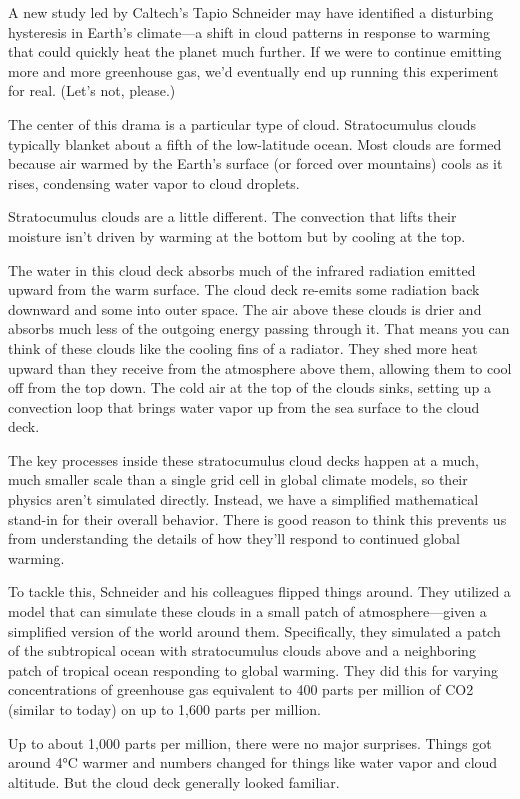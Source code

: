 \documentclass[
]{book}
\begin{document}
A new study led by Caltech's Tapio Schneider may have identified a disturbing hysteresis in Earth's climate---a shift in cloud patterns in response to warming that could quickly heat the planet much further. If we were to continue emitting more and more greenhouse gas, we'd eventually end up running this experiment for real. (Let's not, please.)

The center of this drama is a particular type of cloud. Stratocumulus clouds typically blanket about a fifth of the low-latitude ocean. Most clouds are formed because air warmed by the Earth's surface (or forced over mountains) cools as it rises, condensing water vapor to cloud droplets.

Stratocumulus clouds are a little different. The convection that lifts their moisture isn't driven by warming at the bottom but by cooling at the top.

The water in this cloud deck absorbs much of the infrared radiation emitted upward from the warm surface. The cloud deck re-emits some radiation back downward and some into outer space. The air above these clouds is drier and absorbs much less of the outgoing energy passing through it. That means you can think of these clouds like the cooling fins of a radiator. They shed more heat upward than they receive from the atmosphere above them, allowing them to cool off from the top down. The cold air at the top of the clouds sinks, setting up a convection loop that brings water vapor up from the sea surface to the cloud deck.

The key processes inside these stratocumulus cloud decks happen at a much, much smaller scale than a single grid cell in global climate models, so their physics aren't simulated directly. Instead, we have a simplified mathematical stand-in for their overall behavior. There is good reason to think this prevents us from understanding the details of how they'll respond to continued global warming.

To tackle this, Schneider and his colleagues flipped things around. They utilized a model that can simulate these clouds in a small patch of atmosphere---given a simplified version of the world around them. Specifically, they simulated a patch of the subtropical ocean with stratocumulus clouds above and a neighboring patch of tropical ocean responding to global warming. They did this for varying concentrations of greenhouse gas equivalent to 400 parts per million of CO2 (similar to today) on up to 1,600 parts per million.

Up to about 1,000 parts per million, there were no major surprises. Things got around 4°C warmer and numbers changed for things like water vapor and cloud altitude. But the cloud deck generally looked familiar.
\end{document}
